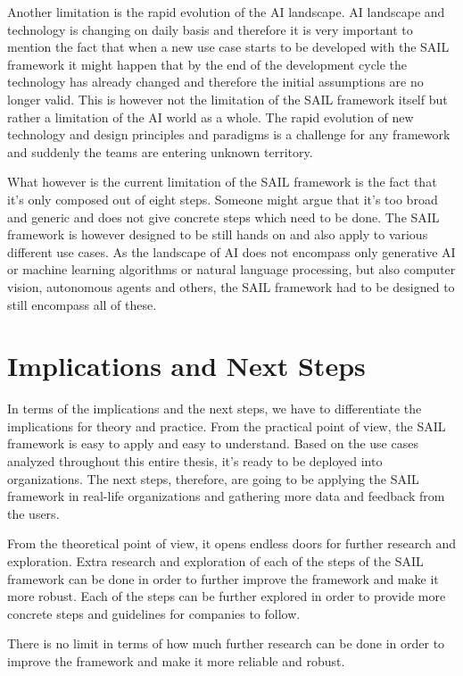 \documentclass[]{imc-inf}
\begin{document}
Another limitation is the rapid evolution of the AI landscape. AI landscape and technology is changing on daily basis and therefore it is very important to mention the fact that when a new use case starts to be developed with the SAIL framework it might happen that by the end of the development cycle the technology has already changed and therefore the initial assumptions are no longer valid. This is however not the limitation of the SAIL framework itself but rather a limitation of the AI world as a whole. The rapid evolution of new technology and design principles and paradigms is a challenge for any framework and suddenly the teams are entering unknown territory. 

What however is the current limitation of the SAIL framework is the fact that it's only composed out of eight steps. Someone might argue that it's too broad and generic and does not give concrete steps which need to be done. 
The SAIL framework is however designed to be still hands on and also apply to various different use cases. As the landscape of AI does not encompass only generative AI or machine learning algorithms or natural language processing, but also computer vision, autonomous agents and others, the SAIL framework had to be designed to still encompass all of these. 




\section{Implications and Next
	Steps}\label{implications-and-next-steps}

In terms of the implications and the next steps, we have to differentiate the implications for theory and practice. 
From the practical point of view, the SAIL framework is easy to apply and easy to understand. Based on the use cases analyzed throughout this entire thesis, it's ready to be deployed into organizations. The next steps, therefore, are going to be applying the SAIL framework in real-life organizations and gathering more data and feedback from the users.

From the theoretical point of view, it opens endless doors for further research and exploration. Extra research and exploration of each of the steps of the SAIL framework can be done in order to further improve the framework and make it more robust. Each of the steps can be further explored in order to provide more concrete steps and guidelines for companies to follow.

There is no limit in terms of how much further research can be done in order to improve the framework and make it more reliable and robust.
\end{document}
